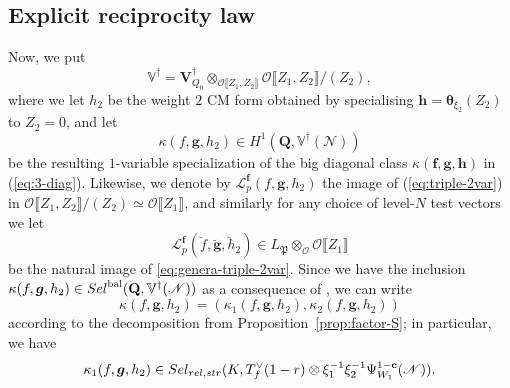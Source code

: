 \documentclass[10pt,letterpaper]{amsart}
\theoremstyle{plain}
\theoremstyle{definition}
\theoremstyle{definition}
\theoremstyle{plain}
\theoremstyle{plain}
\theoremstyle{plain}
\theoremstyle{remark}
\numberwithin{equation}{section}
\newcommand{\cc}{\mathbf{c}}
\newcommand{\ch}{\xi}
\newcommand{\Sel}{Sel}
\newcommand{\rH}{H}
\newcommand{\fkf}{\mathfrak{f}}
\newcommand{\relstr}{{{\rm rel},{\rm str}}}
\DeclareMathOperator{\bal}{\mathrm{bal}}
\def\cO{\mathcal O}
\newcommand{\Vsdag}{{\mathbf{V}_{Q_0}^\dagger}}
\newcommand{\VVdag}{{\mathbb{V}^\dagger}}
\newcommand{\Q}{\mathbf{Q}}
\def\Sel{{\rm Sel}}
\newcommand{\dBr}[1]{\llbracket{#1}\rrbracket}
\newcommand{\bff}{{\boldsymbol{f}}}
\newcommand{\bfg}{{\boldsymbol{g}}}
\newcommand{\bfh}{{\boldsymbol{h}}}
\begin{document}
\subsection{Explicit reciprocity law}
\label{subsec:ERL-def}

Now, we put
\[
\mathbb{V}^\dagger=\Vsdag\otimes_{\cO\dBr{Z_1,Z_2}}\cO\dBr{Z_1,Z_2}/(Z_2), 
\]
where we let $h_2$ be the weight $2$ CM form obtained by specialising $\bfh=\boldsymbol{\theta}_{\xi_2}(Z_2)$ to $Z_2=0$, and let 
\begin{equation}\label{eq:diag1}
\kappa(f,\bfg,h_2)\in\rH^1(\Q,\mathbb{V}^\dagger(\mathscr{N}))
\end{equation}
be the resulting $1$-variable specialization of the big diagonal class $\kappa(\bff,\bfg,\bfh)$ in (\ref{eq:3-diag}). 
%
Likewise, we denote by $\mathscr{L}_p^{\bff}(f,\bfg,h_2)$ the image of (\ref{eq:triple-2var}) in $\cO\dBr{Z_1,Z_2}/(Z_2)\simeq\cO\dBr{Z_1}$, and similarly for any choice of level-$N$ test vectors we let 
\[
\mathscr{L}_p^{\bff}(\breve{f},\breve{\bfg},\breve{h}_2)\in L_{\mathfrak{P}}\otimes_{\cO}\cO\dBr{Z_1}
\]
be the natural image of \eqref{eq:genera-triple-2var}. 
Since we have the inclusion $\kappa(f,\bfg,h_2)\in\Sel^{\bal}(\Q,\VVdag(\mathscr{N}))$ as a consequence of \cite[Cor.~8.2]{BSV}, we can write
\begin{equation}\label{eq:dec-kato1}
\kappa(f,\bfg,h_2)=(\kappa_1(f,\bfg,h_2),\kappa_2(f,\bfg,h_2))
\end{equation}
according to the decomposition from Proposition~\ref{prop:factor-S};  in particular, we have
\begin{equation}\label{eq:kap-1}
\kappa_1(f,\bfg,h_2)\in\Sel_{\relstr}(K,T_f^{\vee}(1-r)\otimes\ch_1^{-1}\ch_2^{-1}\Psi_{W_1}^{1-\cc}(\mathscr{N})).
\end{equation}
\end{document}
